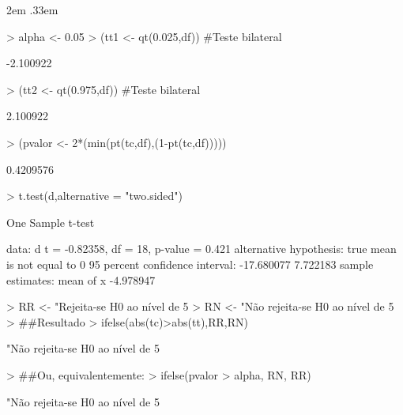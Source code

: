 \documentclass{article}
\newenvironment{ManualExercise}
  {\begin{list}{}{\leftmargin \QuestionIndent
    \partopsep0pt \parsep\parskip \topsep\QuestionBefore
    \itemsep\QuestionBefore \labelwidth2em
    \labelsep.33em
    \usecounter{Question}}}
  {\end{list}}
\begin{document}
\begin{Exercise}
\begin{ManualExercise}
\begin{Schunk}
\begin{Sinput}
> alpha <- 0.05
> (tt1 <- qt(0.025,df)) #Teste bilateral
\end{Sinput}
\begin{Soutput}
[1] -2.100922
\end{Soutput}
\begin{Sinput}
> (tt2 <- qt(0.975,df)) #Teste bilateral
\end{Sinput}
\begin{Soutput}
[1] 2.100922
\end{Soutput}
\begin{Sinput}
> (pvalor <- 2*(min(pt(tc,df),(1-pt(tc,df)))))
\end{Sinput}
\begin{Soutput}
[1] 0.4209576
\end{Soutput}
\begin{Sinput}
> t.test(d,alternative = "two.sided")
\end{Sinput}
\begin{Soutput}
	One Sample t-test

data:  d
t = -0.82358, df = 18, p-value = 0.421
alternative hypothesis: true mean is not equal to 0
95 percent confidence interval:
 -17.680077   7.722183
sample estimates:
mean of x 
-4.978947 
\end{Soutput}
\begin{Sinput}
> RR <- "Rejeita-se H0 ao nível de 5%
> RN <- "Não rejeita-se H0 ao nível de 5%
> ##Resultado
> ifelse(abs(tc)>abs(tt),RR,RN)
\end{Sinput}
\begin{Soutput}
[1] "Não rejeita-se H0 ao nível de 5%
\end{Soutput}
\begin{Sinput}
> ##Ou, equivalentemente:
> ifelse(pvalor > alpha, RN, RR)
\end{Sinput}
\begin{Soutput}
[1] "Não rejeita-se H0 ao nível de 5%
\end{Soutput}
\end{Schunk}
\end{ManualExercise}
\end{Exercise}
\end{document}
